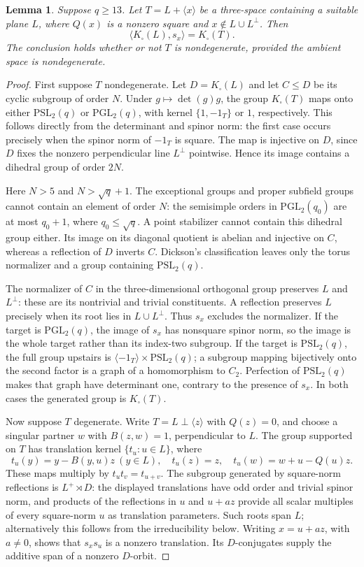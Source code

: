 \documentclass[11pt,a4paper]{article}
\newtheorem{lemma}[theorem]{Lemma}
\newcommand{\gen}[1]{\langle#1\rangle}
\begin{document}
\begin{lemma}\label{three}
Suppose $q\ge13$. Let $T=L+\gen x$ be a three-space containing
a suitable plane $L$, where $Q(x)$ is a nonzero square and
$x\notin L\cup L^\perp$. Then
\[
                  \gen{K_\square(L),s_x}=K_\square(T).
\]
The conclusion holds whether or not $T$ is nondegenerate, provided
the ambient space is nondegenerate.
\end{lemma}
\begin{proof}
First suppose $T$ nondegenerate. Let $D=K_\square(L)$ and let
$C\le D$ be its cyclic subgroup of order $N$. Under
$g\mapsto\det(g)g$, the group $K_\square(T)$ maps onto either
$\mathrm{PSL}_2(q)$ or $\mathrm{PGL}_2(q)$, with kernel
$\{1,-1_T\}$ or $1$, respectively. This follows directly from
the determinant and spinor norm: the first case occurs precisely
when the spinor norm of $-1_T$ is square. The map is injective
on $D$, since $D$ fixes the nonzero perpendicular line $L^\perp$
pointwise. Hence its image contains a dihedral group of order $2N$.

Here $N>5$ and $N>\sqrt q+1$. The exceptional groups and proper
subfield groups cannot contain an element of order $N$: the
semisimple orders in $\mathrm{PGL}_2(q_0)$ are at most $q_0+1$,
where $q_0\le\sqrt q$. A point stabilizer cannot contain this
dihedral group either. Its image on its diagonal quotient is
abelian and injective on $C$, whereas a reflection of $D$ inverts
$C$. Dickson's classification leaves only the torus normalizer
and a group containing $\mathrm{PSL}_2(q)$.

The normalizer of $C$ in the three-dimensional orthogonal group
preserves $L$ and $L^\perp$: these are its nontrivial and trivial
constituents. A reflection preserves $L$ precisely when its root
lies in $L\cup L^\perp$. Thus $s_x$ excludes the normalizer.
If the target is $\mathrm{PGL}_2(q)$, the image of $s_x$ has
nonsquare spinor norm, so the image is the whole target rather
than its index-two subgroup. If the target is
$\mathrm{PSL}_2(q)$, the full group upstairs is
$\gen{-1_T}\times\mathrm{PSL}_2(q)$; a subgroup mapping
bijectively onto the second factor is a graph of a homomorphism
to $C_2$. Perfection of $\mathrm{PSL}_2(q)$ makes that graph
have determinant one, contrary to the presence of $s_x$.
In both cases the generated group is $K_\square(T)$.

Now suppose $T$ degenerate. Write $T=L\perp\gen z$ with
$Q(z)=0$, and choose a singular partner $w$ with $B(z,w)=1$,
perpendicular to $L$. The group supported on $T$ has translation
kernel $\{t_u:u\in L\}$, where
\[
 t_u(y)=y-B(y,u)z\ (y\in L),\quad
 t_u(z)=z,\quad t_u(w)=w+u-Q(u)z.
\]
These maps multiply by $t_ut_v=t_{u+v}$. The subgroup generated
by square-norm reflections is $L^+\rtimes D$: the displayed
translations have odd order and trivial spinor norm, and products
of the reflections in $u$ and $u+az$ provide all scalar multiples
of every square-norm $u$ as translation parameters. Such roots
span $L$; alternatively this follows from the irreducibility below.
Writing $x=u+az$, with $a\ne0$, shows that $s_xs_u$ is a nonzero
translation. Its $D$-conjugates supply the additive span of a
nonzero $D$-orbit.


\end{proof}
\end{document}
